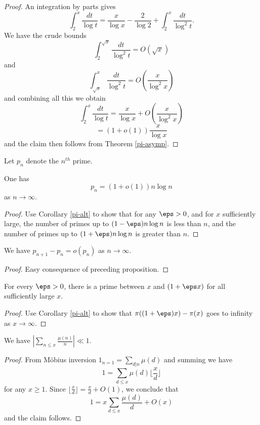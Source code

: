 \begin{proof}
An integration by parts gives
  $$ \int_2^x \frac{dt}{\log t} = \frac{x}{\log x} - \frac{2}{\log 2} + \int_2^x \frac{dt}{\log^2 t}.$$
We have the crude bounds
$$ \int_2^{\sqrt{x}} \frac{dt}{\log^2 t} = O( \sqrt{x} )$$
and
$$ \int_{\sqrt{x}}^x \frac{dt}{\log^2 t} = O( \frac{x}{\log^2 x} )$$
and combining all this we obtain
$$ \int_2^x \frac{dt}{\log t} = \frac{x}{\log x} + O( \frac{x}{\log^2 x} )$$
$$ = (1+o(1)) \frac{x}{\log x}$$
and the claim then follows from Theorem \ref{pi-asymp}.
\end{proof}

Let $p_n$ denote the $n^{th}$ prime.

\begin{proposition}\label{pn-asymptotic}
 One has
  $$ p_n = (1+o(1)) n \log n$$
as $n \to \infty$.
\end{proposition}

\begin{proof}
Use Corollary \ref{pi-alt} to show that for any $\eps>0$, and for $x$ sufficiently large, the number of primes up to $(1-\eps) n \log n$ is less than $n$, and the number of primes up to $(1+\eps) n \log n$ is greater than $n$.
\end{proof}

\begin{corollary} \label{pn-pn+1}
We have $p_{n+1} - p_n = o(p_n)$
  as $n \to \infty$.
\end{corollary}

\begin{proof}
  Easy consequence of preceding proposition.
\end{proof}

\begin{corollary}  \label{prime-between}
For every $\eps>0$, there is a prime between $x$ and $(1+\eps x)$ for all sufficiently large $x$.
\end{corollary}

\begin{proof}
Use Corollary \ref{pi-alt} to show that $\pi((1+\eps)x) - \pi(x)$ goes to infinity as $x \to \infty$.
\end{proof}

\begin{proposition}\label{mun}  We have $|\sum_{n \leq x} \frac{\mu(n)}{n}| \ll 1$.
\end{proposition}

\begin{proof}
From M\"obius inversion $1_{n=1} = \sum_{d|n} \mu(d)$ and summing we have
  $$ 1 = \sum_{d \leq x} \mu(d) \lfloor \frac{x}{d} \rfloor$$
  for any $x \geq 1$.  Since $\lfloor \frac{x}{d} \rfloor = \frac{x}{d} + O(1)$, we conclude that
  $$ 1 = x \sum_{d \leq x} \frac{\mu(d)}{d} + O(x)$$
  and the claim follows.
\end{proof}


